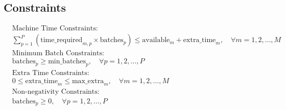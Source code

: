 \documentclass{article}
\begin{document}
\subsection*{Constraints}
\begin{align*}
    & \text{Machine Time Constraints:} \\
    & \sum_{p=1}^{P} (\text{time\_required}_{m,p} \times \text{batches}_{p}) \leq \text{available}_{m} + \text{extra\_time}_{m}, \quad \forall m = 1, 2, \ldots, M \\
    & \text{Minimum Batch Constraints:} \\
    & \text{batches}_{p} \geq \text{min\_batches}_{p}, \quad \forall p = 1, 2, \ldots, P \\
    & \text{Extra Time Constraints:} \\
    & 0 \leq \text{extra\_time}_{m} \leq \text{max\_extra}_{m}, \quad \forall m = 1, 2, \ldots, M \\
    & \text{Non-negativity Constraints:} \\
    & \text{batches}_{p} \geq 0, \quad \forall p = 1, 2, \ldots, P
\end{align*}
\end{document}
